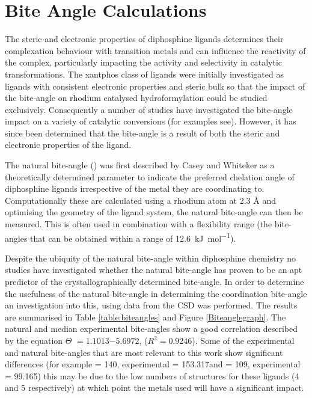 {%

\section{Bite Angle Calculations}

The steric and electronic properties of diphosphine ligands determines their complexation behaviour with transition metals and can influence the reactivity of the complex, particularly impacting the activity and selectivity in catalytic transformations.\cite{Freixa2003, Birkholz2009}  The xantphos class of ligands were initially investigated as ligands with consistent electronic properties and steric bulk so that the impact of the bite-angle on rhodium catalysed hydroformylation could be studied exclusively.\cite{Kranenburg1995}  Consequently a number of studies have investigated the bite-angle impact on a variety of catalytic conversions (for examples see\cite{Kranenburg1995b, Haaren2001b, Dudle2011b, Fanjul2013, Birkholz2009}).  However, it has since been determined that the bite-angle is a result of both the steric and electronic properties of the ligand.\cite{Freixa2003}

The natural bite-angle (\natbiteangle) was first described by Casey and Whiteker\cite{Casey1990} as a theoretically determined parameter to indicate the preferred chelation angle of diphosphine ligands irrespective of the metal they are coordinating to.  Computationally these are calculated using a rhodium atom at 2.3 \si{\angstrom} and optimising the geometry of the ligand system, the natural bite-angle can then be measured.  This is often used in combination with a flexibility range (the bite-angles that can be obtained within a range of 12.6~\si{\kilo\joule\per\mol}).  

Despite the ubiquity of the natural bite-angle within diphosphine chemistry no studies have investigated whether the natural bite-angle has proven to be an apt predictor of the crystallographically determined bite-angle.  In order to determine the usefulness of the natural bite-angle in determining the coordination bite-angle an investigation into this, using data from the \gls{CSD} was performed.  The results are summarised in Table \ref{table:biteangles} and Figure \ref{Biteanglegraph}.  The natural and median experimental bite-angles show a good correlation described by the equation $\Theta$ $= 1.1013$\natbiteangle $- 5.6972$, ($R^2 = 0.9246$).  Some of the experimental and natural bite-angles that are most relevant to this work show significant differences (for example \tBuxantphos{} \natbiteangle{} = 140\degrees, experimental = 153.317\degrees and \Phsixantphos{} \natbiteangle{} = 109, experimental = 99.165\degrees) this may be due to the low numbers of structures for these ligands (4 and 5 respectively) at which point the metals used will have a significant impact. 

}
